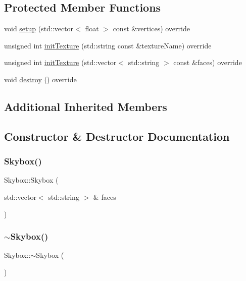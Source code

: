 \subsection*{Protected Member Functions}
\begin{DoxyCompactItemize}
\item 
void \hyperlink{classSkybox_a3f99748c514edd99809a6977f354702f}{setup} (std\+::vector$<$ float $>$ const \&vertices) override
\item 
unsigned int \hyperlink{classSkybox_a0184f32862c7c46efcce78bde9ee9836}{init\+Texture} (std\+::string const \&texture\+Name) override
\item 
unsigned int \hyperlink{classSkybox_ae290e8e7374b983c153b581500cd11f3}{init\+Texture} (std\+::vector$<$ std\+::string $>$ const \&faces) override
\item 
void \hyperlink{classSkybox_a8a93bcf913a1aae88a9a4aa3d20abacc}{destroy} () override
\end{DoxyCompactItemize}
\subsection*{Additional Inherited Members}


\subsection{Constructor \& Destructor Documentation}
\mbox{\label{classSkybox_a9bec390deb9a0f6bd4d8f99237ef6e97}} 
\subsubsection{\texorpdfstring{Skybox()}{Skybox()}}
{\footnotesize\ttfamily Skybox\+::\+Skybox (\begin{DoxyParamCaption}\item[{std\+::vector$<$ std\+::string $>$ \&}]{faces }\end{DoxyParamCaption})}

\mbox{\label{classSkybox_ae5c2aa5802d7ff5d71192643851a4fd7}} 
\subsubsection{\texorpdfstring{$\sim$\+Skybox()}{~Skybox()}}
{\footnotesize\ttfamily Skybox\+::$\sim$\+Skybox (\begin{DoxyParamCaption}{ }\end{DoxyParamCaption})\hspace{0.3cm}{\ttfamily [override]}}



